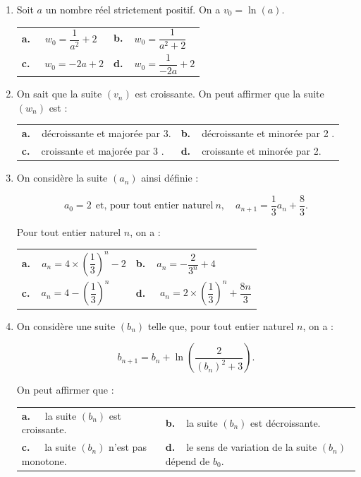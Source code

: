 \documentclass[10pt]{article}
\begin{document}
\begin{enumerate}[resume]
\item  Soit $a$ un nombre réel strictement positif. On a $v_0 = \ln (a)$.

\begin{center}
\begin{tabularx}{\linewidth}{X X}
\textbf{a.~~} $w_0 = \dfrac{1}{a^2}  +2$&\textbf{b.~~}$w_0 = \dfrac{1}{a^2  +2}$\\
\textbf{c.~~} $w_0 = -2a +2$&\textbf{d.~~}$w_0 = \dfrac{1}{- 2a} + 2$
\end{tabularx}
\end{center}

\item On sait que la suite $\left(v_n\right)$ est croissante. On peut affirmer que la suite $\left(w_n\right)$ est :

\begin{center}
\begin{tabularx}{\linewidth}{X X}
\textbf{a.~~}décroissante et majorée par 3.&\textbf{b.~~}décroissante et minorée par 2 .\\
\textbf{c.~~}croissante et majorée par 3 .&\textbf{d.~~}croissante et minorée par 2.
\end{tabularx}
\end{center}

\item On considère la suite $\left(a_n\right)$ ainsi définie :

\[a_0 = 2 \:\:\text{et, pour tout entier naturel}\: n, \quad a_{n+1} = \dfrac13a_n + \dfrac83.\]


Pour tout entier naturel $n$, on a :
\begin{center}
\begin{tabularx}{\linewidth}{X X}
\textbf{a.~~}$a_n = 4 \times \left(\dfrac13\right)^n - 2$&\textbf{b.~~}$a_n = - \dfrac{2}{3^n} + 4$\\
\textbf{c.~~}$a_n = 4 - \left(\dfrac13\right)^n$ & \textbf{d.~~} $a_n = 2 \times \left(\dfrac13\right)^n + \dfrac{8n}{3}$
\end{tabularx}
\end{center}
\item On considère une suite $\left(b_n\right)$ telle que, pour tout entier naturel $n$, on a :

\[b_{n+1} = b_n + \ln \left(\dfrac{2}{\left(b_n \right)^2 + 3}\right).\]

On peut affirmer que :

\begin{center}
\begin{tabularx}{\linewidth}{X X}
\textbf{a.~~} la suite $\left(b_n\right)$ est croissante.&\textbf{b.~~}la suite $\left(b_n\right)$ est décroissante.\\
\textbf{c.~~} la suite $\left(b_n\right)$ n'est pas monotone.&\textbf{d.~~}le sens de variation de la suite $\left(b_n\right)$ dépend de $b_0$.
\end{tabularx}
\end{center}


\end{enumerate}
\end{document}
